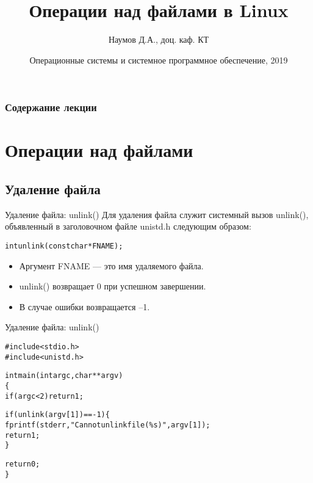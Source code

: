 \documentclass{beamer}
\title[Файловая система]{Операции над файлами в Linux}
\author{Наумов Д.А., доц. каф. КТ}
\date[12.11.2019] {Операционные системы и системное программное обеспечение, 2019}
\begin{document}
\begin{frame}
  \titlepage
\end{frame}
  
\begin{frame}
  \frametitle{Содержание лекции}
  \tableofcontents  
\end{frame}

\section{Операции над файлами}

\subsection{Удаление файла}

\begin{frame}[fragile]{Удаление файла: unlink()}
Для удаления файла служит системный вызов unlink(), объявленный в заголовочном файле unistd.h следующим образом:
\begin{alltt}
int unlink (const char * FNAME);
\end{alltt}
\begin{itemize}
\item Аргумент FNAME — это имя удаляемого файла. 
\item unlink() возвращает 0 при успешном завершении. 
\item В случае ошибки возвращается –1.
\end{itemize}
\end{frame}

\begin{frame}[fragile]{Удаление файла: unlink()}
\begin{alltt}
#include <stdio.h>
#include <unistd.h>

int main (int argc, char ** argv)
\{
  if (argc < 2) return 1;
  
  if (unlink (argv[1]) == -1) \{
    fprintf (stderr, "Cannot unlink file (\%s)", argv[1]);
    return 1;
  \}
  
  return 0;
\}
\end{alltt}
\end{frame}
\end{document}
